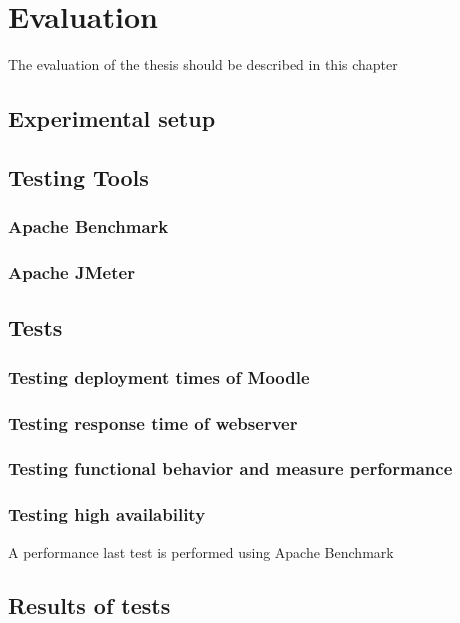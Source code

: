 \chapter{Evaluation}
\label{cha:evaluation}

The evaluation of the thesis should be described in this chapter

\section{Experimental setup}
\section{Testing Tools}
\subsection{Apache Benchmark}
\subsection{Apache JMeter}
\section{Tests}
\subsection{Testing deployment times of Moodle}
\subsection{Testing response time of webserver}
\subsection{Testing functional behavior and measure performance}
\subsection{Testing high availability}
A performance last test is performed using Apache Benchmark 
\section{Results of tests}
